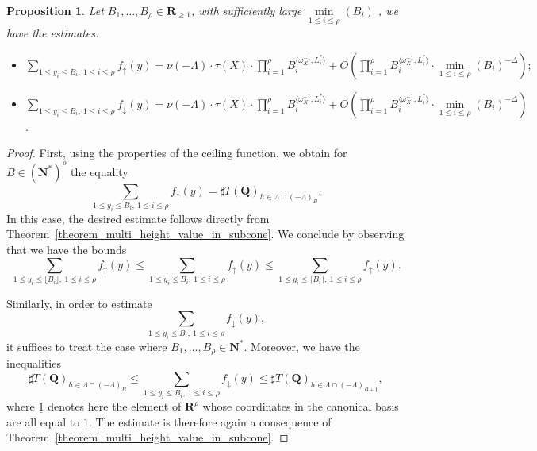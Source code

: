 \documentclass[10pt,a4paper]{amsart}
\newtheorem{prop}{Proposition}
\newcommand{\N}{\mathbf{N}}
\newcommand{\Q}{\mathbf{Q}}
\newcommand{\R}{\mathbf{R}}
\newcommand{\w}{\omega}
\begin{document}
\begin{prop}\label{proposition_first_hypothesis_arithmetic_function}
    Let $B_1, \dots, B_{\rho} \in \R_{\geqslant 1}$, with sufficiently large $\min\limits_{1 \leqslant i \leqslant {\rho}}(B_i)$ , we have the estimates:
\begin{itemize}
    \item $\sum\limits_{1 \leqslant y_i \leqslant B_i,\ 1 \leqslant i \leqslant \rho} f_{\uparrow}(y) 
= \nu(-\Lambda) \cdot \tau(X) \cdot \prod\limits_{i = 1}^{\rho} B_i^{\langle \w_X^{-1},L_i^* \rangle} 
+ O \!\left( \prod\limits_{i = 1}^{\rho} B_i^{\langle \w_X^{-1},L_i^* \rangle} \cdot
\min\limits_{1 \leqslant i \leqslant {\rho}}(B_i)^{-\Delta} \right) ;$ 
    \item $\sum\limits_{1 \leqslant y_i \leqslant B_i,\ 1 \leqslant i \leqslant \rho} f_{\downarrow}(y) 
= \nu(-\Lambda) \cdot \tau(X) \cdot \prod\limits_{i = 1}^{\rho} B_i^{\langle \w_X^{-1},L_i^* \rangle} 
+ O \!\left( \prod\limits_{i = 1}^{\rho} B_i^{\langle \w_X^{-1},L_i^* \rangle} \cdot
\min\limits_{1 \leqslant i \leqslant {\rho}}(B_i)^{-\Delta} \right) $.
\end{itemize}
\end{prop}

\begin{proof}
First, using the properties of the ceiling function, we obtain for
\(B \in (\N^{*})^{\rho}\) the equality
\[
\sum_{1 \leqslant y_i \leqslant B_i,\ 1 \leqslant i \leqslant \rho}
f_{\uparrow}(y)
=
\sharp T(\Q)_{h \in \Lambda \cap (-\Lambda)_B }.
\]
In this case, the desired estimate follows directly from
Theorem~\ref{theorem_multi_height_value_in_subcone}.
We conclude by observing that we have the bounds
\[
\sum_{1 \leqslant y_i \leqslant \lfloor B_i \rfloor,\ 1 \leqslant i \leqslant \rho}
f_{\uparrow}(y)
\leqslant
\sum_{1 \leqslant y_i \leqslant B_i,\ 1 \leqslant i \leqslant \rho}
f_{\uparrow}(y)
\leqslant
\sum_{1 \leqslant y_i \leqslant \lceil B_i \rceil,\ 1 \leqslant i \leqslant \rho}
f_{\uparrow}(y).
\]

Similarly, in order to estimate
\[
\sum_{1 \leqslant y_i \leqslant B_i,\ 1 \leqslant i \leqslant \rho}
f_{\downarrow}(y),
\]
it suffices to treat the case where \(B_1, \dots, B_{\rho} \in \N^*\).
Moreover, we have the inequalities
\[
\sharp T(\Q)_{h \in\Lambda \cap (-\Lambda)_B}
\leqslant
\sum_{1 \leqslant y_i \leqslant B_i,\ 1 \leqslant i \leqslant \rho}
f_{\downarrow}(y)
\leqslant
\sharp T(\Q)_{h \in \Lambda \cap (-\Lambda)_{B+ \underline{1} }},
\]
where \(\underline{1}\) denotes here the element of \(\R^{\rho}\) whose coordinates in the
canonical basis are all equal to \(1\).
The estimate is therefore again a consequence of
Theorem~\ref{theorem_multi_height_value_in_subcone}.
\end{proof}
\end{document}
